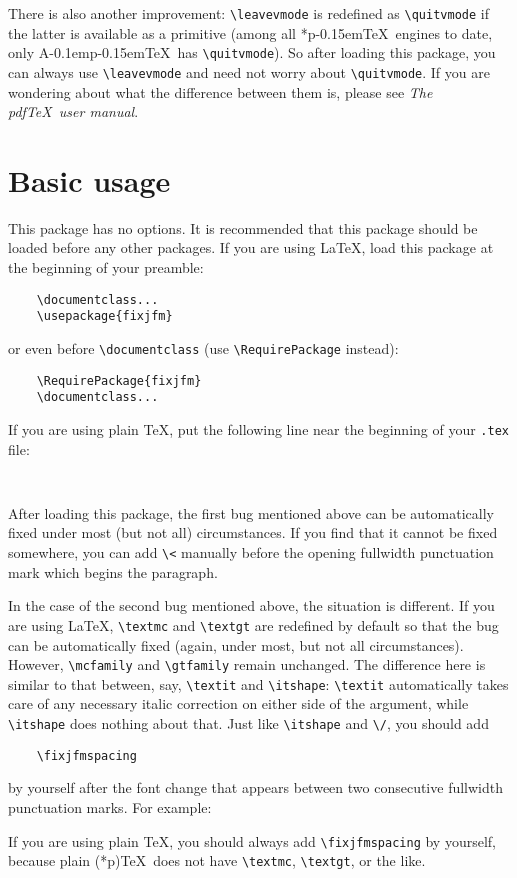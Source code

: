 \documentclass[a4paper]{article}
\newcommand\pTeX{p\kern-0.15em\TeX}
\newcommand\ApTeX{A\kern-0.1em\pTeX}
\newcommand\FwBox{\ensuremath{\square}\hskip0em plus 0.05em\relax}
\newcommand\TwoFwBoxes{\FwBox\FwBox}
\newcommand\eclmvtt{test}
\begin{document}
There is also another improvement: \verb|\leavevmode| is redefined as
\verb|\quitvmode| if the latter is available as a primitive (among all *\pTeX\
engines to date, only \ApTeX\ has \verb|\quitvmode|). So after loading this
package, you can always use \verb|\leavevmode| and need not worry about
\verb|\quitvmode|. If you are wondering about what the difference between them
is, please see \textit{The pdf\TeX\ user manual}.

\section{Basic usage}

This package has no options. It is recommended that this package should be
loaded before any other packages. If you are using \LaTeX, load this package at
the beginning of your preamble:
\begin{verbatim}
    \documentclass...
    \usepackage{fixjfm}
\end{verbatim}
or even before \verb|\documentclass| (use \verb|\RequirePackage| instead):
\begin{verbatim}
    \RequirePackage{fixjfm}
    \documentclass...
\end{verbatim}
If you are using plain \TeX, put the following line near the beginning of your
\verb|.tex| file:
\begin{verbatim}
    
\end{verbatim}

After loading this package, the first bug mentioned above can be automatically
fixed under most (but not all) circumstances. If you find that it cannot be
fixed somewhere, you can add \verb|\<| manually before the opening fullwidth
punctuation mark which begins the paragraph.

In the case of the second bug mentioned above, the situation is different. If
you are using \LaTeX, \verb|\textmc| and \verb|\textgt| are redefined by default
so that the bug can be automatically fixed (again, under most, but not all
circumstances). However, \verb|\mcfamily| and \verb|\gtfamily| remain unchanged.
The difference here is similar to that between, say, \verb|\textit| and
\verb|\itshape|: \verb|\textit| automatically takes care of any necessary italic
correction on either side of the argument, while \verb|\itshape| does nothing
about that. Just like \verb|\itshape| and \verb|\/|, you should add
\begin{verbatim}
    \fixjfmspacing
\end{verbatim}
by yourself after the font change that appears between two consecutive fullwidth
punctuation marks. For example:
\begin{trivlist}\item\relax{\ttfamily\hskip2em}\TwoFwBoxes
\hbox to 1\wd\fwbox{\texttt{,}\hss}\verb|{\gtfamily\fixjfmspacing|%
\hbox to 1\wd\fwbox{\hss{\eclmvtt``}}\TwoFwBoxes
\hbox to 1\wd\fwbox{{\eclmvtt''}\hss}\verb|}\fixjfmspacing|%
\hbox to 1\wd\fwbox{\hss{\eclmvtt``}}\TwoFwBoxes
\hbox to 1\wd\fwbox{{\eclmvtt''}\hss}%
\end{trivlist}
If you are using plain \TeX, you should always add \verb|\fixjfmspacing| by
yourself, because plain (*p)\TeX\ does not have \verb|\textmc|, \verb|\textgt|,
or the like.
\end{document}
